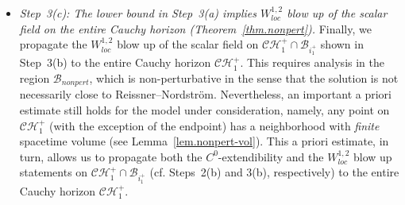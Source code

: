 \documentclass[10pt, reqno]{amsart}
\theoremstyle{definition}
\theoremstyle{remark}
\numberwithin{equation}{section}
\newcommand{\0}{\emptyset}
\newcommand{\calC}{\mathcal C}
\newcommand{\calH}{\mathcal H}
\newcommand{\CH}{\calC \calH^{+}}		%
\newcommand{\pfstep}[1]{\vspace{.5em} {\it \noindent #1.}}
\newcommand{\Int}{\mathscr{B}}
\begin{document}
\begin{itemize}
\item \pfstep{Step~3(c): The lower bound in Step~3(a) implies $W^{1,2}_{loc}$ blow up of the scalar field on the entire Cauchy horizon (Theorem~\ref{thm.nonpert})} 
Finally, we propagate the $W^{1,2}_{loc}$ blow up of the scalar field on $\CH_{1} \cap \Int_{i^{+}_{1}}$ shown in Step~3(b) to the entire Cauchy horizon $\CH_{1}$. This requires analysis in the region $\Int_{nonpert}$, which is non-perturbative in the sense that the solution is not necessarily close to Reissner--Nordstr\"om. Nevertheless, an important a priori estimate still holds for the model under consideration, namely, any point on $\CH_{1}$ (with the exception of the endpoint) has a neighborhood with \emph{finite} spacetime volume (see Lemma~\ref{lem.nonpert-vol}). This a priori estimate, in turn, allows us to propagate both the $C^{0}$-extendibility and the $W^{1,2}_{loc}$ blow up statements on $\CH_{1} \cap \Int_{i^{+}_{1}}$ (cf. Steps~2(b) and 3(b), respectively) to the entire Cauchy horizon $\CH_{1}$.
\end{itemize}
\end{document}
